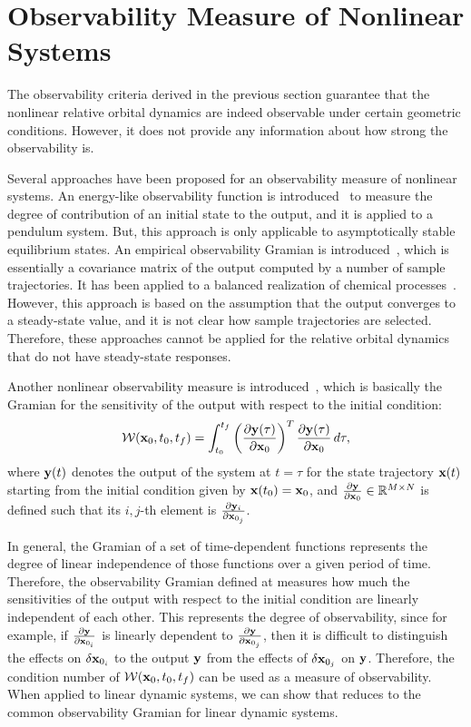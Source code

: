 \section{Observability Measure of Nonlinear Systems}

The observability criteria derived in the previous section guarantee that the nonlinear relative orbital dynamics are indeed observable under certain geometric conditions. However, it does not provide any information about how strong the observability is. 

Several approaches have been proposed for an observability measure of nonlinear systems. 
An energy-like observability function is introduced~\cite{SchSCL93,Sch94,NewKriPICDC98} to measure the degree of contribution of an initial state to the output, and it is applied to a pendulum system. But, this approach is only applicable to asymptotically stable equilibrium states. An empirical observability Gramian is introduced~\cite{LalMarPIWC99,LalMarIJRNC02}, which is essentially a covariance matrix of the output computed by a number of sample trajectories.
It has been applied to a balanced realization of chemical processes~\cite{HahEdgJPC03,HahEdgCCE02}. However, this approach is based on the assumption that the output converges to a steady-state value, and it is not clear how  sample trajectories are selected. Therefore, these approaches cannot be applied for the relative orbital dynamics that do not have steady-state responses. 

Another nonlinear observability measure is introduced~\cite{KreIdePICDC09}, which is basically the Gramian for the sensitivity of the output with respect to the initial condition:
\begin{align}
\mathcal{W} (\mathbf{x}_0,t_0,t_f) = \int_{t_0}^{t_f} \left( \frac{\partial \mathbf{y}(\tau)}{\partial \mathbf{x}_0} \right)^T\frac{\partial \mathbf{y}(\tau)}{\partial \mathbf{x}_0}\,d\tau,\label{eqn:Wo_NL}
\end{align}
where $\mathbf{y}(t)$ denotes the output of the system at $t=\tau$ for the state trajectory $\mathbf{x}(t)$ starting from the initial condition given by $\mathbf{x}(t_0)=\mathbf{x}_0$, and $\frac{\partial \mathbf{y}}{\partial \mathbf{x}_0}\in\mathbb{R}^{M\times N}$ is defined such that its $i,j$-th element is $\frac{\partial \mathbf{y}_i}{\partial \mathbf{x}_{0_j}}$. 

In general, the Gramian of a set of time-dependent functions represents the degree of linear independence of those functions over a given period of time. Therefore, the observability Gramian defined at  measures how much the sensitivities of the output with respect to the initial condition are linearly independent of each other. This represents the degree of observability, since for example, if $\frac{\partial \mathbf{y}}{\partial \mathbf{x}_{0_i}}$ is linearly dependent to $\frac{\partial \mathbf{y}}{\partial \mathbf{x}_{0_j}}$, then it is difficult to distinguish the effects on $\delta \mathbf{x}_{0_i}$ to the output $\mathbf{y}$ from the effects of $\delta \mathbf{x}_{0_j}$ on $\mathbf{y}$. Therefore, the condition number of $\mathcal{W} (\mathbf{x}_0,t_0,t_f)$ can be used as a measure of observability. When applied to linear dynamic systems, we can show that  reduces to the common observability Gramian for linear dynamic systems.

